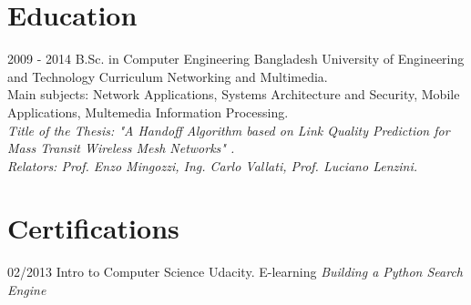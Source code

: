 \documentclass[]{friggeri-cv}
\begin{document}
\section{Education}
\begin{entrylist}
  \entry
    {2009 - 2014}
    {B.Sc. in Computer Engineering}
    {Bangladesh University of Engineering and Technology}
    {Curriculum Networking and Multimedia.\\
    Main subjects: Network Applications, Systems Architecture and Security, Mobile Applications, Multemedia Information            Processing.\\
    \emph{Title of the Thesis: "A Handoff Algorithm based on Link Quality Prediction for Mass Transit Wireless Mesh Networks"      .}\\
    \emph{Relators: Prof. Enzo Mingozzi, Ing. Carlo Vallati, Prof. Luciano Lenzini.}\\}
\end{entrylist}

\section{Certifications}
\begin{entrylist}
  \entry
    {02/2013}
    {Intro to Computer Science}
    {Udacity. E-learning}
    {\emph{Building a Python Search Engine}}
\end{entrylist}



% 
\end{document}
